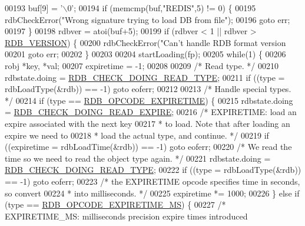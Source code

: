 \begin{DoxyCode}
{{{{{{{{00193     buf[9] = \textcolor{stringliteral}{'\(\backslash\)0'};
00194     \textcolor{keywordflow}{if} (memcmp(buf,\textcolor{stringliteral}{"REDIS"},5) != 0) \{
00195         rdbCheckError(\textcolor{stringliteral}{"Wrong signature trying to load DB from file"});
00196         \textcolor{keywordflow}{goto} err;
00197     \}
00198     rdbver = atoi(buf+5);
00199     \textcolor{keywordflow}{if} (rdbver < 1 || rdbver > \hyperlink{rdb_8h_ae34418fdbb9794fb7558a4f58bdc1cad}{RDB\_VERSION}) \{
00200         rdbCheckError(\textcolor{stringliteral}{"Can't handle RDB format version %
00201         \textcolor{keywordflow}{goto} err;
00202     \}
00203 
00204     startLoading(fp);
00205     \textcolor{keywordflow}{while}(1) \{
00206         robj *key, *val;
00207         expiretime = -1;
00208 
00209         \textcolor{comment}{/* Read type. */}
00210         rdbstate.doing = \hyperlink{redis-check-rdb_8c_aa0a7dfd3a3e0ac75d688d559a3704bc4}{RDB\_CHECK\_DOING\_READ\_TYPE};
00211         \textcolor{keywordflow}{if} ((type = rdbLoadType(&rdb)) == -1) \textcolor{keywordflow}{goto} eoferr;
00212 
00213         \textcolor{comment}{/* Handle special types. */}
00214         \textcolor{keywordflow}{if} (type == \hyperlink{rdb_8h_a32013d8fe12eeff5f8c1de859aae8a55}{RDB\_OPCODE\_EXPIRETIME}) \{
00215             rdbstate.doing = \hyperlink{redis-check-rdb_8c_a1ea6b327825b203156f25d5690203cc9}{RDB\_CHECK\_DOING\_READ\_EXPIRE};
00216             \textcolor{comment}{/* EXPIRETIME: load an expire associated with the next key}
00217 \textcolor{comment}{             * to load. Note that after loading an expire we need to}
00218 \textcolor{comment}{             * load the actual type, and continue. */}
00219             \textcolor{keywordflow}{if} ((expiretime = rdbLoadTime(&rdb)) == -1) \textcolor{keywordflow}{goto} eoferr;
00220             \textcolor{comment}{/* We read the time so we need to read the object type again. */}
00221             rdbstate.doing = \hyperlink{redis-check-rdb_8c_aa0a7dfd3a3e0ac75d688d559a3704bc4}{RDB\_CHECK\_DOING\_READ\_TYPE};
00222             \textcolor{keywordflow}{if} ((type = rdbLoadType(&rdb)) == -1) \textcolor{keywordflow}{goto} eoferr;
00223             \textcolor{comment}{/* the EXPIRETIME opcode specifies time in seconds, so convert}
00224 \textcolor{comment}{             * into milliseconds. */}
00225             expiretime *= 1000;
00226         \} \textcolor{keywordflow}{else} \textcolor{keywordflow}{if} (type == \hyperlink{rdb_8h_a718021856b2b0cf1c9c907a3a91a39c4}{RDB\_OPCODE\_EXPIRETIME\_MS}) \{
00227             \textcolor{comment}{/* EXPIRETIME\_MS: milliseconds precision expire times introduced}
}}}}}}}}}
\end{DoxyCode}
